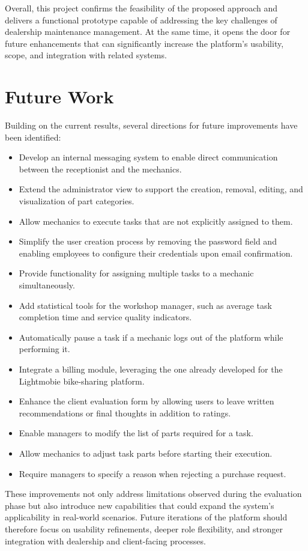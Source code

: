 Overall, this project confirms the feasibility of the proposed approach and delivers a functional prototype capable of addressing the key challenges of dealership maintenance management. At the same time, it opens the door for future enhancements that can significantly increase the platform's usability, scope, and integration with related systems.

\section{Future Work}

Building on the current results, several directions for future improvements have been identified:

\begin{itemize}
    \item Develop an internal messaging system to enable direct communication between the receptionist and the mechanics.
    \item Extend the administrator view to support the creation, removal, editing, and visualization of part categories.
    \item Allow mechanics to execute tasks that are not explicitly assigned to them.
    \item Simplify the user creation process by removing the password field and enabling employees to configure their credentials upon email confirmation.
    \item Provide functionality for assigning multiple tasks to a mechanic simultaneously.
    \item Add statistical tools for the workshop manager, such as average task completion time and service quality indicators.
    \item Automatically pause a task if a mechanic logs out of the platform while performing it.
    \item Integrate a billing module, leveraging the one already developed for the Lightmobie bike-sharing platform.
    \item Enhance the client evaluation form by allowing users to leave written recommendations or final thoughts in addition to ratings.
    \item Enable managers to modify the list of parts required for a task.
    \item Allow mechanics to adjust task parts before starting their execution.
    \item Require managers to specify a reason when rejecting a purchase request.
\end{itemize}

These improvements not only address limitations observed during the evaluation phase but also introduce new capabilities that could expand the system's applicability in real-world scenarios. Future iterations of the platform should therefore focus on usability refinements, deeper role flexibility, and stronger integration with dealership and client-facing processes.
 